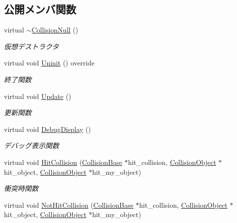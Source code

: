 \subsection*{公開メンバ関数}
\begin{DoxyCompactItemize}
\item 
virtual \mbox{\hyperlink{class_collision_null_a2eaef584b2ae2c4062df8bf3a6533fb3}{$\sim$\+Collision\+Null}} ()
\begin{DoxyCompactList}\small\item\em 仮想デストラクタ \end{DoxyCompactList}\item 
virtual void \mbox{\hyperlink{class_collision_null_a7c6d0ec502efc55e2f406415451152f5}{Uninit}} () override
\begin{DoxyCompactList}\small\item\em 終了関数 \end{DoxyCompactList}\item 
virtual void \mbox{\hyperlink{class_collision_null_a5e5e094e3fbe3ccc0515e485c739bd15}{Update}} ()
\begin{DoxyCompactList}\small\item\em 更新関数 \end{DoxyCompactList}\item 
virtual void \mbox{\hyperlink{class_collision_null_a3ee0dacfb13c949538519f39d2f6fb0f}{Debug\+Display}} ()
\begin{DoxyCompactList}\small\item\em デバッグ表示関数 \end{DoxyCompactList}\item 
virtual void \mbox{\hyperlink{class_collision_null_a580f507d8918865679feec3cc7b613d1}{Hit\+Collision}} (\mbox{\hyperlink{class_collision_base}{Collision\+Base}} $\ast$hit\+\_\+collision, \mbox{\hyperlink{class_collision_object}{Collision\+Object}} $\ast$hit\+\_\+object, \mbox{\hyperlink{class_collision_object}{Collision\+Object}} $\ast$hit\+\_\+my\+\_\+object)
\begin{DoxyCompactList}\small\item\em 衝突時関数 \end{DoxyCompactList}\item 
virtual void \mbox{\hyperlink{class_collision_null_aba2a574ab42dca618c41dd0b9562f614}{Not\+Hit\+Collision}} (\mbox{\hyperlink{class_collision_base}{Collision\+Base}} $\ast$hit\+\_\+collision, \mbox{\hyperlink{class_collision_object}{Collision\+Object}} $\ast$hit\+\_\+object, \mbox{\hyperlink{class_collision_object}{Collision\+Object}} $\ast$hit\+\_\+my\+\_\+object)

\end{DoxyCompactItemize}
